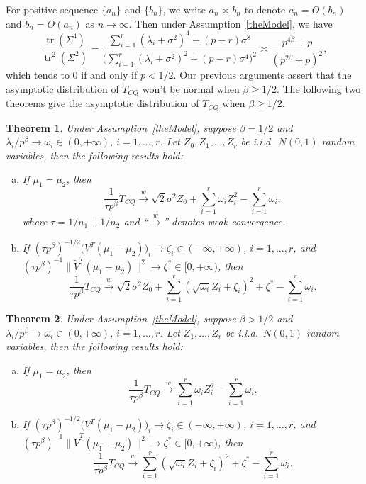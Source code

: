 \documentclass[review]{elsarticle}
\DeclareMathOperator{\mytr}{tr}
\theoremstyle{plain}
\newtheorem{theorem}{\quad\quad Theorem}
\theoremstyle{definition}
\theoremstyle{remark}
\begin{document}
For positive sequence $\{a_n\}$ and $\{b_n\}$, we write $a_n\asymp b_n$ to denote $a_n=O(b_n)$ and $b_n=O(a_n)$ as $n\to \infty$.
Then under Assumption~\ref{theModel}, we have
$$
\frac{\mytr(\Sigma^4)}{\mytr^2(\Sigma^2)}=\frac{\sum_{i=1}^r (\lambda_i+\sigma^2)^4+(p-r)\sigma^8}{\big(\sum_{i=1}^r (\lambda_i+\sigma^2)^2+(p-r)\sigma^4\big)^2}\asymp \frac{p^{4\beta}+p}{(p^{2\beta}+p)^2},
$$
 which tends to $0$ if and only if $p<1/2$.
Our previous arguments assert that the asymptotic distribution of $T_{CQ}$ won't be normal when $\beta\geq 1/2$.
The following two theorems give the asymptotic distribution of $T_{CQ}$ when $\beta\geq 1/2$.
\begin{theorem}\label{Chenstheory1}
 Under Assumption~\ref{theModel},
    suppose $\beta=1/2$ and $\lambda_i/p^\beta \to \omega_i\in(0,+\infty)$, $i=1,\ldots,r$.
    Let $Z_{0},Z_1,\ldots,Z_{r}$ be i.i.d.\ $N(0,1)$ random variables,
     then the following results hold:
     \begin{enumerate}[(a)]
         \item
             If $\mu_1=\mu_2$, then
    $$
        \frac{1}{\tau p^{\beta}} T_{CQ}
        \xrightarrow{w}
\sqrt{2}\sigma^2 Z_0
+
        \sum_{i=1}^r \omega_i Z_i^2
            -
        \sum_{i=1}^r \omega_i,
    $$
             where $\tau=1/n_1+1/n_2$ and ``$\xrightarrow{w}$'' denotes weak convergence.
         \item
             If $(\tau p^{\beta})^{-1/2}\big(V^T (\mu_1-\mu_2)\big)_i\to \zeta_i\in(-\infty,+\infty)$, $i=1,\ldots,r$,
             and
    ${(\tau p^\beta)}^{-1}\|\tilde{V}^T (\mu_1-\mu_2)\|^2\to \zeta^*\in [0,+\infty)$, then
    $$
        \frac{1}{\tau p^{\beta}} T_{CQ}
        \xrightarrow{w}
\sqrt{2}\sigma^2 Z_0+
        \sum_{i=1}^r (\sqrt{\omega_i} Z_i+\zeta_i)^2+
\zeta^*
        -
        \sum_{i=1}^r \omega_i.
    $$
     \end{enumerate}
\end{theorem}

\begin{theorem}\label{Chenstheory2}
 Under Assumption~\ref{theModel},
    suppose $\beta>1/2$ and $\lambda_i/p^\beta \to \omega_i\in(0,+\infty)$, $i=1,\ldots,r$.
    Let $Z_1,\ldots,Z_{r}$ be i.i.d.\ $N(0,1)$ random variables,
     then the following results hold:
     \begin{enumerate}[(a)]
         \item
             If $\mu_1=\mu_2$, then
    $$
        \frac{1}{\tau p^{\beta}} T_{CQ}
        \xrightarrow{w}
        \sum_{i=1}^r \omega_i Z_i^2
            -
        \sum_{i=1}^r \omega_i.
    $$
         \item
             If $(\tau p^{\beta})^{-1/2}\big(V^T (\mu_1-\mu_2)\big)_i\to \zeta_i\in(-\infty,+\infty)$, $i=1,\ldots,r$,
             and
    ${(\tau p^\beta)}^{-1}\|\tilde{V}^T (\mu_1-\mu_2)\|^2\to \zeta^*\in [0,+\infty)$, then
    $$
        \frac{1}{\tau p^{\beta}} T_{CQ}
        \xrightarrow{w}
        \sum_{i=1}^r (\sqrt{\omega_i} Z_i+\zeta_i)^2+
\zeta^*
        -
        \sum_{i=1}^r \omega_i.
    $$
     \end{enumerate}
\end{theorem}
\end{document}
